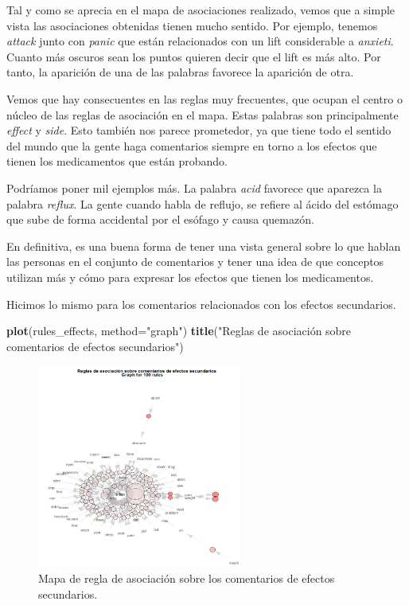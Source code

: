 \documentclass[spanish,]{article}
\newenvironment{Shaded}{\begin{snugshade}}{\end{snugshade}}
\newcommand{\KeywordTok}[1]{\textcolor[rgb]{0.13,0.29,0.53}{\textbf{#1}}}
\newcommand{\DataTypeTok}[1]{\textcolor[rgb]{0.13,0.29,0.53}{#1}}
\newcommand{\StringTok}[1]{\textcolor[rgb]{0.31,0.60,0.02}{#1}}
\newcommand{\NormalTok}[1]{#1}
\begin{document}
Tal y como se aprecia en el mapa de asociaciones realizado, vemos que a
simple vista las asociaciones obtenidas tienen mucho sentido. Por
ejemplo, tenemos \emph{attack} junto con \emph{panic} que están
relacionados con un lift considerable a \emph{anxieti}. Cuanto más
oscuros sean los puntos quieren decir que el lift es más alto. Por
tanto, la aparición de una de las palabras favorece la aparición de
otra.

Vemos que hay consecuentes en las reglas muy frecuentes, que ocupan el
centro o núcleo de las reglas de asociación en el mapa. Estas palabras
son principalmente \emph{effect} y \emph{side}. Esto también nos parece
prometedor, ya que tiene todo el sentido del mundo que la gente haga
comentarios siempre en torno a los efectos que tienen los medicamentos
que están probando.

Podríamos poner mil ejemplos más. La palabra \emph{acid} favorece que
aparezca la palabra \emph{reflux}. La gente cuando habla de reflujo, se
refiere al ácido del estómago que sube de forma accidental por el
esófago y causa quemazón.

En definitiva, es una buena forma de tener una vista general sobre lo
que hablan las personas en el conjunto de comentarios y tener una idea
de que conceptos utilizan más y cómo para expresar los efectos que
tienen los medicamentos.

Hicimos lo mismo para los comentarios relacionados con los efectos
secundarios.

\begin{Shaded}
\begin{Highlighting}[]
\KeywordTok{plot}\NormalTok{(rules_effects, }\DataTypeTok{method=}\StringTok{"graph"}\NormalTok{)}
\KeywordTok{title}\NormalTok{(}\StringTok{"Reglas de asociación sobre comentarios de efectos secundarios"}\NormalTok{)}
\end{Highlighting}
\end{Shaded}

\begin{figure}[ht]
    \centering
    \includegraphics[width=0.6\textwidth]{figuras/asociacion/asociacion_efectos.png}
    \caption{Mapa de regla de asociación sobre los comentarios de efectos secundarios.}
    \label{fig:asociacion:effects}
\end{figure}
\end{document}
